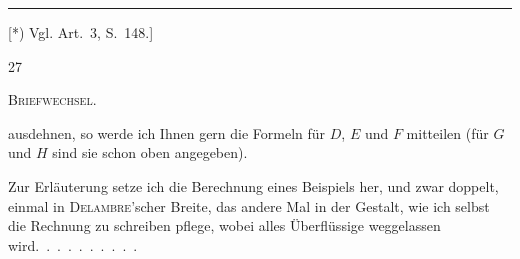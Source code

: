 \par\medskip\noindent\rule{4cm}{.4pt}\par
{\footnotesize [*) Vgl. Art.~3, S.~148.]\par}
\vfill{}\hfill27\hfill\mbox{}\par
\clearpage
{}\hfill\textsc{Briefwechsel.}\hfill\mbox{}\par\medskip
\noindent ausdehnen, so werde ich Ihnen gern die Formeln für $D$, $E$ und $F$ mitteilen (für $G$ und $H$ sind sie schon oben angegeben).

Zur Erläuterung setze ich die Berechnung eines Beispiels her, und zwar doppelt, einmal in \textsc{Delambre}'scher Breite, das andere Mal in der Gestalt, wie ich selbst die Rechnung zu schreiben pflege, wobei alles Überflüssige weggelassen wird.\ .\ .\ .\ .\ .\ .\ .\ .\ .

